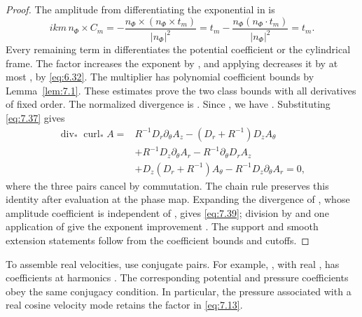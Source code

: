 \begin{proof}
The amplitude from differentiating the exponential in  is
\[
  ikm\,n_\Phi\times C_m
  =-\frac{n_\Phi\times(n_\Phi\times t_m)}{|n_\Phi|^2}
  =t_m-\frac{n_\Phi(n_\Phi\cdot t_m)}{|n_\Phi|^2}
  =t_m.
\]
Every remaining term in  differentiates the potential coefficient
 or the cylindrical
frame. The factor  increases the
 exponent by , and applying
 decreases it by at
most , by \eqref{eq:6.32}. The multiplier
 has polynomial coefficient bounds by Lemma~\ref{lem:7.1}.
These estimates prove the two class bounds with all derivatives of fixed order. The normalized
divergence is
.
Since , we have
. Substituting \eqref{eq:7.37} gives
\begin{align*}
  \operatorname{div}_*\operatorname{curl}_*A
   ={}&R^{-1}D_r\partial_\theta A_z-(D_r+R^{-1})D_zA_\theta\\
     &+R^{-1}D_z\partial_\theta A_r-R^{-1}\partial_\theta D_rA_z\\
     &+D_z(D_r+R^{-1})A_\theta-R^{-1}D_z\partial_\theta A_r=0,
\end{align*}
where the three pairs cancel by commutation. The chain rule preserves this identity after
evaluation at the phase map. Expanding the divergence of
, whose amplitude
coefficient is independent of , gives \eqref{eq:7.39}; division by
 and one application of  give
the exponent improvement . The support and smooth extension statements follow
from the coefficient bounds and cutoffs.
\end{proof}

To assemble real velocities, use conjugate pairs. For example,
, with real ,
has coefficients  at harmonics
. The corresponding potential and pressure
coefficients obey the same conjugacy condition. In particular, the pressure associated with a
real cosine velocity mode retains the factor  in \eqref{eq:7.13}.

